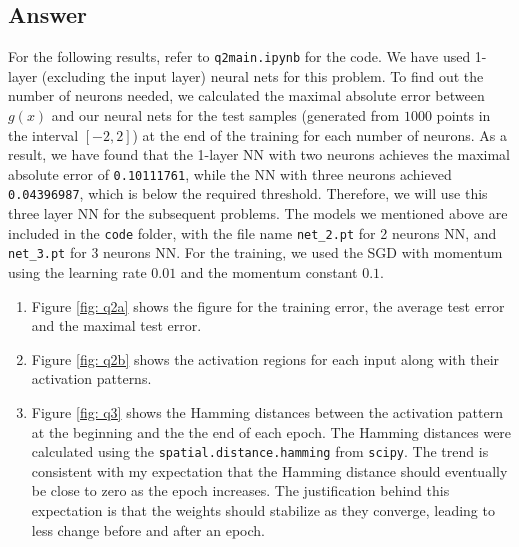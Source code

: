 \documentclass[
	12pt, %
]{../Template/fphw}
\begin{document}
\subsection*{Answer}
For the following results, refer to \verb|q2main.ipynb| for the code. We have used 1-layer (excluding the input layer) neural nets for this problem. To find out the number of neurons needed, we calculated the maximal absolute error between $g(x)$ and our neural nets for the test samples (generated from $1000$ points in the interval $[-2,2]$) at the end of the training for each number of neurons. As a result, we have found that the 1-layer NN with two neurons achieves the maximal absolute error of \verb|0.10111761|, while the NN with three neurons achieved \verb|0.04396987|, which is below the required threshold. Therefore, we will use this three layer NN for the subsequent problems. The models we mentioned above are included in the \verb|code| folder, with the file name \verb|net_2.pt| for 2 neurons NN, and \verb|net_3.pt| for 3 neurons NN. For the training, we used the SGD with momentum using the learning rate $0.01$ and the momentum constant $0.1$.

\begin{enumerate}[label = (\alph*)]
	\item Figure \ref{fig: q2a} shows the figure for the training error, the average test error and the maximal test error. 
    \item Figure \ref{fig: q2b} shows the activation regions for each input along with their activation patterns.
    \item Figure \ref{fig: q3} shows the Hamming distances between the activation pattern at the beginning and the the end of each epoch. The Hamming distances were calculated using the \verb|spatial.distance.hamming| from \verb|scipy|. The trend is consistent with my expectation that the Hamming distance should eventually be close to zero as the epoch increases. The justification behind this expectation is that the weights should stabilize as they converge, leading to less change before and after an epoch.
\end{enumerate}
\end{document}

